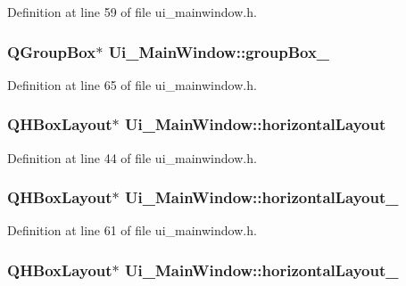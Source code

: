 \-Definition at line 59 of file ui\-\_\-mainwindow.\-h.

\hypertarget{class_ui___main_window_abb28acde35ffce4d0e6152579df2cbc3}{
\subsubsection[{group\-Box\-\_\-2}]{\setlength{\rightskip}{0pt plus 5cm}\-Q\-Group\-Box$\ast$ {\bf \-Ui\-\_\-\-Main\-Window\-::group\-Box\-\_}}}\label{class_ui___main_window_abb28acde35ffce4d0e6152579df2cbc3}


\-Definition at line 65 of file ui\-\_\-mainwindow.\-h.

\hypertarget{class_ui___main_window_acd6fdc9ebacc4b25b834162380d75ce8}{
\subsubsection[{horizontal\-Layout}]{\setlength{\rightskip}{0pt plus 5cm}\-Q\-H\-Box\-Layout$\ast$ {\bf \-Ui\-\_\-\-Main\-Window\-::horizontal\-Layout}}}\label{class_ui___main_window_acd6fdc9ebacc4b25b834162380d75ce8}


\-Definition at line 44 of file ui\-\_\-mainwindow.\-h.

\hypertarget{class_ui___main_window_a80867018070156432923d0266cc9fe25}{
\subsubsection[{horizontal\-Layout\-\_\-2}]{\setlength{\rightskip}{0pt plus 5cm}\-Q\-H\-Box\-Layout$\ast$ {\bf \-Ui\-\_\-\-Main\-Window\-::horizontal\-Layout\-\_}}}\label{class_ui___main_window_a80867018070156432923d0266cc9fe25}


\-Definition at line 61 of file ui\-\_\-mainwindow.\-h.

\hypertarget{class_ui___main_window_a03ce63974cc69b067c91bbf285cceca8}{
\subsubsection[{horizontal\-Layout\-\_\-3}]{\setlength{\rightskip}{0pt plus 5cm}\-Q\-H\-Box\-Layout$\ast$ {\bf \-Ui\-\_\-\-Main\-Window\-::horizontal\-Layout\-\_}}}\label{class_ui___main_window_a03ce63974cc69b067c91bbf285cceca8}


